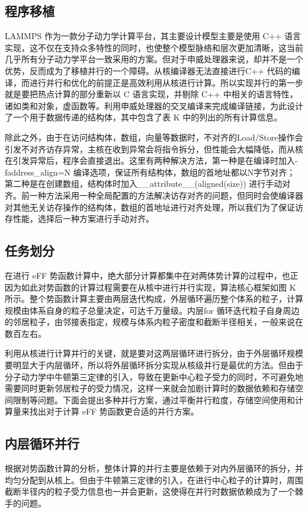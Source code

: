 \subsection{程序移植}
LAMMPS 作为一款分子动力学计算平台，其主要设计模型主要是使用 C++ 语言实现，这不仅在支持众多特性的同时，也使整个模型脉络和层次更加清晰，这当前几乎所有分子动力学平台一致采用的方案。但对于申威处理器来说，却并不是一个优势，反而成为了移植并行的一个障碍。从核编译器无法直接进行C++ 代码的编译，而进行并行和优化的前提正是高效利用从核进行计算。所以实现并行的第一步就是要把热点计算的部分重新以 C 语言实现，并剔除 C++ 中相关的语言特性，诸如类和对象，虚函数等。利用申威处理器的交叉编译来完成编译链接，为此设计了一个用于数据传递的结构体，其中包含了表 K 中的列出的所有计算信息。

除此之外，由于在访问结构体，数组，向量等数据时，不对齐的Load/Store操作会引发不对齐访存异常，主核在收到异常会将指令拆分，但性能会大幅降低，而从核在引发异常后，程序会直接退出。这里有两种解决方法，第一种是在编译时加入-faddress\_align=N 编译选项，保证所有结构体，数组的首地址都以N字节对齐；第二种是在创建数组，结构体时加入\_\_attribute\_\_(aligned(size)) 进行手动对齐。前一种方法采用一种全局配置的方法解决访存对齐的问题，但同时会使编译器对其他无关访存操作的结构体，数组的首地址进行对齐处理，所以我们为了保证访存性能，选择后一种方案进行手动对齐。

\subsection{任务划分}
在进行 eFF 势函数计算中，绝大部分计算都集中在对两体势计算的过程中，也正因为如此对势函数的计算过程需要在从核中进行并行实现，算法核心框架如图 K 所示。整个势函数计算主要由两层迭代构成，外层循环遍历整个体系的粒子，计算规模由体系自身的粒子总量决定，可达千万量级。内层for 循环迭代粒子自身周边的邻居粒子，由邻接表指定，规模与体系内粒子密度和截断半径相关，一般来说在数百左右。

利用从核进行计算并行的关键，就是要对这两层循环进行拆分，由于外层循环规模要明显大于内层循环，所以将外层循环拆分实现从核级并行是最优的方法。但由于分子动力学中牛顿第三定律的引入，导致在更新中心粒子受力的同时，不可避免地需要同时更新邻居粒子的受力情况，这样一来就会加剧计算时的数据依赖和存储空间限制等问题。下面会提出多种并行方案，通过平衡并行粒度，存储空间使用和计算量来找出对于计算 eFF 势函数更合适的并行方案。

\subsection{内层循环并行}
根据对势函数计算的分析，整体计算的并行主要是依赖于对内外层循环的拆分，并均匀分配到从核上。但由于牛顿第三定律的引入，在进行中心粒子的计算时，周围截断半径内的粒子受力信息也一并会更新，这使得在并行时数据依赖成为了一个棘手的问题。

